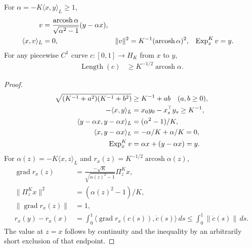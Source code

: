 \begin{lemma}
For $\alpha=-K\langle x,y\rangle_L\ge1$,
\begin{align}
 v&=\frac{\operatorname{arcosh}\alpha}{\sqrt{\alpha^2-1}}(y-\alpha x),\\
 \langle x,v\rangle_L&=0,&
 \|v\|^2&=K^{-1}(\operatorname{arcosh}\alpha)^2,&\operatorname{Exp}_x^Kv&=y.
\end{align}
For any piecewise $C^1$ curve $c:[0,1]\to H_K$ from $x$ to $y$,
\begin{align}
 \operatorname{Length}(c)&\ge K^{-1/2}\operatorname{arcosh}\alpha.
\end{align}
\end{lemma}
\begin{proof}
\begin{align}
 \sqrt{(K^{-1}+a^2)(K^{-1}+b^2)}&\ge K^{-1}+ab\quad(a,b\ge0),\\
 -\langle x,y\rangle_L&=x_0y_0-x_s^\top y_s\ge K^{-1},\\
 \langle y-\alpha x,y-\alpha x\rangle_L&=(\alpha^2-1)/K,\\
 \langle x,y-\alpha x\rangle_L&=-\alpha/K+\alpha/K=0,\\
 \operatorname{Exp}_x^Kv&=\alpha x+(y-\alpha x)=y.
\end{align}
For $\alpha(z)=-K\langle x,z\rangle_L$ and
$r_x(z)=K^{-1/2}\operatorname{arcosh}\alpha(z)$,
\begin{align}
 \operatorname{grad}r_x(z)
 &=\frac{-\sqrt K}{\sqrt{\alpha(z)^2-1}}\Pi_z^Kx,\\
 \|\Pi_z^Kx\|^2&=(\alpha(z)^2-1)/K,\\
 \|\operatorname{grad}r_x(z)\|&=1,\\
 r_x(y)-r_x(x)&=\int_0^1\langle\operatorname{grad}r_x(c(s)),\dot c(s)\rangle\,ds
 \le\int_0^1\|\dot c(s)\|\,ds.
\end{align}
The value at $z=x$ follows by continuity and the inequality by an arbitrarily short exclusion of that endpoint.
\end{proof}
